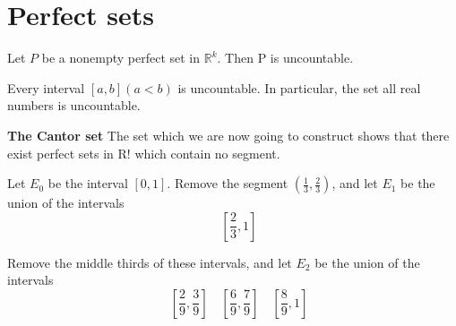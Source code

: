 \section{Perfect sets}


\begin{thm}\label{thm:2.43 uncountable}
    Let $P$ be a nonempty perfect set in $\mathbb{R}^k$. Then P is uncountable.    
\end{thm}





\begin{myCorollary}
	Every interval $[a, b] (a <b)$ is uncountable. In particular, the set
	all real numbers is uncountable.
\end{myCorollary}


\begin{myDef}
	\textbf{The Cantor set} The set which we are now going to construct shows
	that there exist perfect sets in R! which contain no segment.
\end{myDef}

Let $E_0$ be the interval $[0, 1]$. Remove the segment $(\frac{1}{3}, \frac{2}{3})$, and let $E_1$ be the union of the intervals
\begin{equation*}
    [0, \frac{1}{3}] \quad 
    [\frac{2}{3}, 1]
\end{equation*}

Remove the middle thirds of these intervals, and let $E_2$ be the union of the intervals
\begin{equation*}
    [0, \frac{1}{9}] \quad 
    [\frac{2}{9}, \frac{3}{9}] \quad 
    [\frac{6}{9}, \frac{7}{9}] \quad 
    [\frac{8}{9}, 1]
\end{equation*}


